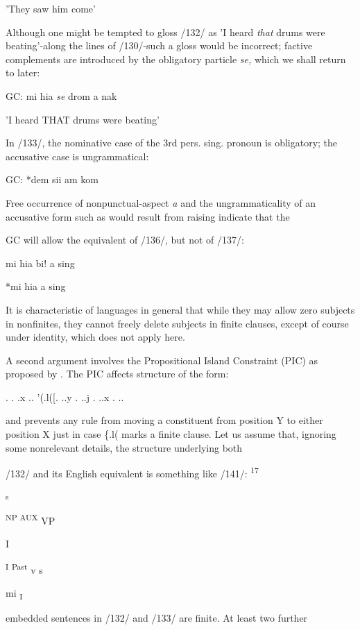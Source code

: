 'They saw him come'

Although one might be tempted to gloss /132/ as 'I heard \textit{that} drums were beating'{}-along the lines of /130/{}-such a gloss would be incorrect;
factive complements are introduced by the obligatory particle \textit{se,}
which we shall return to later:

\ea\label{ex:134}
 GC: mi hia \textit{se} drom a nak
\glt
\z

'I heard THAT drums were beating'

In /133/, the nominative case of the 3rd pers. sing. pronoun is obliga\-tory; the accusative case is ungrammatical:

\ea\label{ex:135}
 GC: *dem sii am kom
\glt
\z

Free occurrence of nonpunctual-aspect \textit{a} and the ungrammaticality of an accusative form such as would result from raising indicate that the

GC will allow the equivalent of /136/, but not of /137/:

\ea\label{ex:138}
 mi hia bi! a sing
\glt
\z

\ea\label{ex:139}
 *mi hia a sing
\glt
\z

It is characteristic of languages in general that while they may allow zero subjects in nonfinites, they cannot freely delete subjects in finite clauses, except of course under identity, which does not apply here.

A second argument involves the Propositional Island Constraint (PIC) as proposed by \citet{Chomsky1977}. The PIC affects structure of the form:

\ea\label{ex:140}
 . . .x .. '(.l([. ..y . ..j . ..x . ..
\glt
\z

and prevents any rule from moving a constituent from position Y to either position X just in case \{.l( marks a finite clause. Let us assume that, ignoring some nonrelevant details, the structure underlying both

/132/ and its English equivalent is something like /141/: \textsuperscript{17}

\ea\label{ex:141}
 \textsubscript{s}
\glt
\z

  


 

\textsuperscript{NP AUX} VP 

I

\textsuperscript{I }\textsuperscript{Past }v s

mi \textsubscript{I}

embedded sentences in /132/ and /133/ are finite. At least two further

